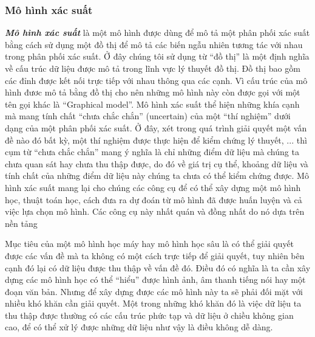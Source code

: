         \subsubsection{Mô hình xác suất}
        \textbf{\textit{Mô hình xác suất}} là một mô hình được dùng để mô tả một phân 
        phối xác suất bằng cách sử dụng một đồ thị để mô tả các biến 
        ngẫu nhiên tương tác với nhau trong phân phối xác suất. Ở đây 
        chúng tôi sử dụng từ ``đồ thị'' là một định nghĩa về cấu trúc 
        dữ liệu được mô tả trong lĩnh vực lý thuyết đồ thị. Đồ thị 
        bao gồm các đỉnh được kết nối trực tiếp với nhau thông qua 
        các cạnh. Vì cấu trúc của mô hình đươc mô tả bằng đồ thị cho 
        nên những mô hình này còn được gọi với một tên gọi khác là 
        ``Graphical model''.
        Mô hình xác suất thể hiện những khía cạnh mà mang tính chất ``chưa chắc chắn'' (uncertain) của một ``thí nghiệm'' dưới dạng của một phân phối xác suất. Ở đây, xét trong quá trình giải quyết một vấn đề nào đó bất kỳ, một thí nghiệm được thực hiện để kiểm chứng lý thuyết, ... thì cụm từ ``chưa chắc chắn'' mang ý nghĩa là chỉ những điểm dữ liệu mà chúng ta chưa quan sát hay chưa thu thập được, do đó về giá trị cụ thể, khoảng dữ liệu và tính chất của những điểm dữ liệu này chúng ta chưa có thể kiểm chứng được. Mô hình xác suất mang lại cho chúng các công cụ để có thể xây dựng một mô hình học, thuật toán học, cách đưa ra dự đoán từ mô hình đã được huấn luyện và cả việc lựa chọn mô hình. Các công cụ này nhất quán và đồng nhất do nó dựa trên nền tảng 


        Mục tiêu của một mô hình học máy hay mô hình học sâu là có thể giải quyết được các vấn đề mà ta không có một cách trực tiếp để giải quyết, tuy nhiên bên cạnh đó lại có dữ liệu được thu thập về vấn đề đó. Điều đó có nghĩa là ta cần xây dựng các mô hình học có thể ``hiểu'' được hình ảnh, âm thanh tiếng nói hay một đoạn văn bản. Nhưng để xây dựng được các mô hình này ta sẽ phải đối mặt với nhiều khó khăn cần giải quyết. Một trong những khó khăn đó là việc dữ liệu ta thu thập được thường có các cấu trúc phức tạp và dữ liệu ở chiều không gian cao, để có thể xử lý được những dữ liệu như vậy là điều không dễ dàng. 

